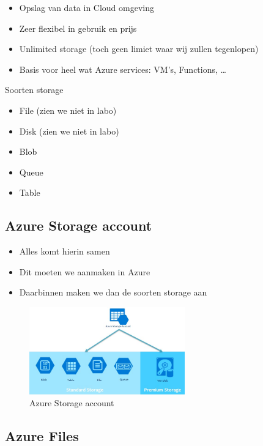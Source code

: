 \documentclass{article}
\begin{document}
\begin{itemize}
    \item Opslag van data in Cloud omgeving
    \item Zeer flexibel in gebruik en prijs
    \item Unlimited storage (toch geen limiet waar wij zullen tegenlopen)
    \item Basis voor heel wat Azure services: VM's, Functions, \dots
\end{itemize}

Soorten storage

\begin{itemize}
    \item File (zien we niet in labo)
    \item Disk (zien we niet in labo)
    \item Blob
    \item Queue
    \item Table
\end{itemize}

\subsection{Azure Storage account}

\begin{itemize}
    \item Alles komt hierin samen
    \item Dit moeten we aanmaken in Azure
    \item Daarbinnen maken we dan de soorten storage aan
\end{itemize}

\begin{figure}[H]
    \centering
    \includegraphics[width=0.6\textwidth]{azure-storage-account.png}
    \caption{Azure Storage account}
\end{figure}

\subsection{Azure Files}
\end{document}
